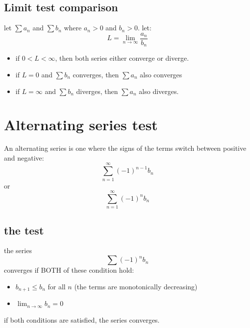 \documentclass{article}
\begin{document}
                        \subsection{Limit test comparison}
                            let \(\sum a_n \) and \(\sum b_n\)  where \(a_n > 0\) and \(b_n > 0\). 
                            let: 
                                \[L = \lim_{n \to \infty} \frac{a_n}{b_n}\]
                                \begin{itemize}
                                    \item if \(0 < L < \infty\), then both series either converge or diverge. 
                                    \item if \(L = 0\) and \(\sum b_n\) converges, then \(\sum a_n\) also converges
                                    \item if \(L = \infty\) and \(\sum b_n\) diverges, then \(\sum a_n\) also diverges.
                                \end{itemize}
                    \section{Alternating series test}
                                An alternating series is one where the signs of the terms switch between positive and negative: 
                                    \[\sum_{n = 1}^{\infty} {(-1)}^{n-1} b_n\]
                                    or 
                                    \[\sum_{n = 1}^{\infty} {(-1)}^{n} b_n\]
                                \subsection{the test} 
                                    the series 
                                    \[\sum {(-1)}^{n} b_n\]
                                    converges if BOTH of these condition hold: 
                                    \begin{itemize}
                                        \item \(b_{n+1} \leq b_n \) for all \(n\) (the terms are monotonically decreasing)
                                        \item \(\lim_{n \to \infty} b_n = 0\)
                                    \end{itemize}
                                    if both conditions are satisfied, the series converges.
                                

                
\end{document}
